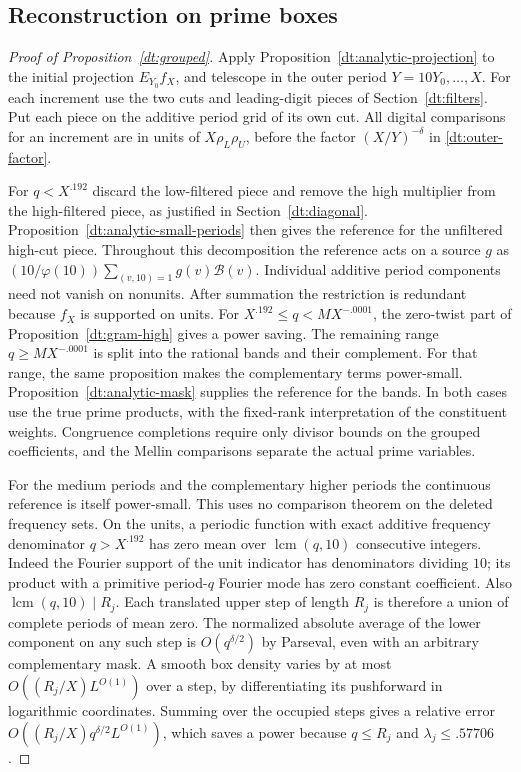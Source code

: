\documentclass[11pt,a4paper]{article}
\theoremstyle{paperplain}
\numberwithin{equation}{section}
\begin{document}
\subsection{Reconstruction on prime boxes}\label{dt:comparison-proof}

\begin{proof}[Proof of Proposition~\ref{dt:grouped}]
Apply Proposition~\ref{dt:analytic-projection} to the initial
projection \(E_{Y_0}f_X\), and telescope in the outer period
\(Y=10Y_0,\ldots,X\). For each increment use the two cuts and
leading-digit pieces of Section~\ref{dt:filters}. Put each piece
on the additive period grid of its own cut. All digital comparisons
for an increment are in units of \(X\rho_L\rho_U\), before the
factor \((X/Y)^{-\delta}\) in \eqref{dt:outer-factor}.

For \(q<X^{.192}\) discard the low-filtered piece and remove the
high multiplier from the high-filtered piece, as justified in
Section~\ref{dt:diagonal}. Proposition~\ref{dt:analytic-small-periods}
then gives the reference for the unfiltered high-cut piece.
Throughout this decomposition the reference acts on a source \(g\) as
\((10/\varphi(10))\sum_{(v,10)=1}g(v)\mathcal B(v)\). Individual
additive period components need not vanish on nonunits. After summation
the restriction is redundant because \(f_X\) is supported on units.
For \(X^{.192}\le q<MX^{-.0001}\), the zero-twist part of
Proposition~\ref{dt:gram-high} gives a power saving. The remaining
range \(q\ge MX^{-.0001}\) is split into the rational bands and
their complement. For that range, the same proposition makes
the complementary terms power-small.
Proposition~\ref{dt:analytic-mask} supplies the reference
for the bands. In both cases use
the true prime products, with the fixed-rank interpretation of
the constituent weights. Congruence completions require only
divisor bounds on the grouped coefficients, and the Mellin
comparisons separate the actual prime variables.

For the medium periods and the complementary higher periods the
continuous reference is itself power-small. This uses no comparison
theorem on the deleted frequency sets. On the units, a periodic function
with exact additive frequency denominator \(q>X^{.192}\) has zero
mean over \(\operatorname{lcm}(q,10)\) consecutive integers.
Indeed the Fourier support of the unit indicator has denominators
dividing \(10\); its product with a primitive period-\(q\) Fourier
mode has zero constant coefficient. Also
\(\operatorname{lcm}(q,10)\mid R_j\). Each translated upper step
of length \(R_j\) is therefore a union of complete periods of mean
zero. The normalized absolute average of the lower component on
any such step is \(O(q^{\delta/2})\) by Parseval, even with an
arbitrary complementary mask. A smooth box density varies by at most
\(O((R_j/X)L^{O(1)})\) over a step, by differentiating its
pushforward in logarithmic coordinates. Summing over the occupied
steps gives a relative error \(O((R_j/X)q^{\delta/2}L^{O(1)})\),
which saves a power because \(q\le R_j\) and
\(\lambda_j\le.57706\).


\end{proof}
\end{document}
